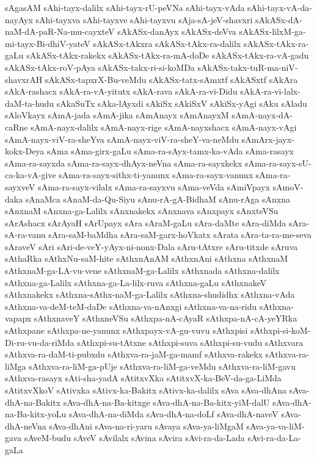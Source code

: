 {sAgasAM
sAhi-tayx-dalilx
sAhi-tayx-rU-peVNa
sAhi-tayx-vAda
sAhi-tayx-vA-da-nayAyx
sAhi-tayxva
sAhi-tayxve
sAhi-tayxvu
sAja-sA-jeV-shavxri
sAkASx-dA-naM-dA-paR-Na-mu-cayxteV
sAkASx-danAyx
sAkASx-deVva
sAkASx-lilxM-ga-mi-tayx-Bi-dhiV-yateV
sAkASx-tAkxra
sAkASx-tAkx-ra-dalilx
sAkASx-tAkx-ra-gaLu
sAkASx-tAkx-rakekx
sAkASx-tAkx-ra-mA-doDe
sAkASx-tAkx-ra-vA-gadu
sAkASx-tAkx-roV-pAya
sAkASx-takx-ri-si-koMDa
sAkASx-takx-tuR-ma-niV-shavxrAH
sAkASx-tapxrX-Bu-veMdu
sAkASx-tatx-sAmxtf
sAkASxtf
sAkAra
sAkA-rashacx
sAkA-ra-vA-yitutx
sAkA-rava
sAkA-ra-vi-Didu
sAkA-ra-vi-lalx-daM-ta-hudu
sAkaSuTx
sAka-lAyxdi
sAkiSx
sAkiSxV
sAkiSx-yAgi
sAku
sAladu
sAloVkayx
sAmA-jada
sAmA-jika
sAmAnayx
sAmAnayxM
sAmA-nayx-dA-caRne
sAmA-nayx-dalilx
sAmA-nayx-rige
sAmA-nayxshacx
sAmA-nayx-vAgi
sAmA-nayx-viV-ra-sheYva
sAmA-nayx-viV-ra-sheY-va-neMdu
sAmArx-jayx-kokx-Deya
sAma
sAma-girx-gaLu
sAma-ra-sAyx-tamx-ka-vAda
sAma-rasayx
sAma-ra-sayxda
sAma-ra-sayx-dhAyx-neVna
sAma-ra-sayxkekx
sAma-ra-sayx-sU-ca-ka-vA-give
sAma-ra-sayx-sithx-ti-yanunx
sAma-ra-sayx-vanunx
sAma-ra-sayxveV
sAma-ra-sayx-vilalx
sAma-ra-sayxvu
sAma-veVda
sAmiVpayx
sAmoV-daka
sAnaMca
sAnaM-da-Qu-Siyu
sAnu-rA-gA-BidhaM
sAnu-rAga
sAnxna
sAnxnaM
sAnxna-ga-Lalilx
sAnxnakekx
sAnxnava
sAnxpayx
sAnxteVSu
sArAshacx
sArAyaH
sArUpayx
sAra
sAraM-gaLu
sAra-daMte
sAra-diMda
sAra-sA-ra-vanu
sAra-saM-baMdha
sAra-saM-garx-hoVkatx
sArata
sAra-ta-ra-me-seva
sAraveV
sAri
sAri-de-veY-yAyx-ni-nonx-Dala
sAru-tAtxre
sAru-titxde
sAruva
sAthaRka
sAthxNu-saM-hite
sAthxnAnAM
sAthxnAni
sAthxna
sAthxnaM
sAthxnaM-ga-LA-vu-vene
sAthxnaM-ga-Lalilx
sAthxnada
sAthxna-dalilx
sAthxna-ga-Lalilx
sAthxna-ga-La-lilx-ruva
sAthxna-gaLu
sAthxnakeV
sAthxnakekx
sAthxna-sAthx-naM-ga-Lalilx
sAthxna-shudidhx
sAthxna-vAda
sAthxna-va-deM-teM-daDe
sAthxna-va-nAnxgi
sAthxna-va-na-ridu
sAthxna-vapapx
sAthxnaveY
sAthxneVSu
sAthxpa-nA-cAyaR
sAthxpa-nA-cA-yeYRka
sAthxpane
sAthxpa-ne-yanunx
sAthxpayx-vA-gu-vuvu
sAthxpisi
sAthxpi-si-koM-Di-ru-vu-da-riMda
sAthxpi-su-tAtxne
sAthxpi-suva
sAthxpi-su-vudu
sAthxvara
sAthxva-ra-daM-ti-pubxdu
sAthxva-ra-jaM-ga-mamf
sAthxva-rakekx
sAthxva-ra-liMga
sAthxva-ra-liM-ga-pUje
sAthxva-ra-liM-ga-veMdu
sAthxva-ra-liM-gavu
sAthxva-rasayx
sAti-sha-yadA
sAtitxvXka
sAtitxvX-ka-BeV-da-ga-LiMda
sAtitxvXkoV
sAtivxka
sAtivx-ka-Bakitx
sAtivx-ka-dalilx
sAva
sAva-dhAna
sAva-dhA-na-Bakitx
sAva-dhA-na-Ba-kitxge
sAva-dhA-na-Ba-kitx-yiM-dalU
sAva-dhA-na-Ba-kitx-yoLu
sAva-dhA-na-diMda
sAva-dhA-na-doLf
sAva-dhA-naveV
sAva-dhA-neVna
sAva-dhAni
sAva-na-ri-yaru
sAvaya
sAva-ya-liMgaM
sAva-ya-va-liM-gava
sAveM-budu
sAveV
sAvilalx
sAvina
sAvira
sAvi-ra-da-Lada
sAvi-ra-da-La-gaLa
}
